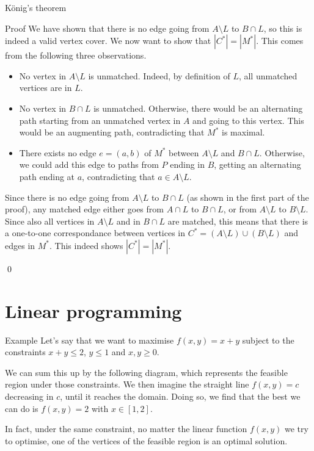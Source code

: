 \documentclass[a4paper]{article}
\begin{document}
\begin{parag}{König's theorem}
\begin{subparag}{Proof}
        We have shown that there is no edge going from $A \setminus L$ to $B \cap L$, so this is indeed a valid vertex cover. We now want to show that $\left|C^*\right| = \left|M^*\right|$. This comes from the following three observations.
        \begin{itemize}[left=0pt]
            \item No vertex in $A \setminus L$ is unmatched. Indeed, by definition of $L$, all unmatched vertices are in $L$.
            \item No vertex in $B \cap L$ is unmatched. Otherwise, there would be an alternating path starting from an unmatched vertex in $A$ and going to this vertex. This would be an augmenting path, contradicting that $M^*$ is maximal.
            \item There exists no edge $e = \left(a, b\right)$ of $M^*$ between $A \setminus L$ and $B \cap L$. Otherwise, we could add this edge to paths from $P$ ending in $B$, getting an alternating path ending at $a$, contradicting that $a \in A \setminus L$.
        \end{itemize}

        Since there is no edge going from $A \setminus L$ to $B \cap L$ (as shown in the first part of the proof), any matched edge either goes from $A \cap L$ to $B \cap L$, or from $A \setminus L$ to $B \setminus L$. Since also all vertices in $A \setminus L$ and in $B \cap L$ are matched, this means that there is a one-to-one correspondance between vertices in $C^* = \left(A \setminus L\right) \cup \left(B \setminus L\right)$ and edges in $M^*$. This indeed shows $\left|C^*\right| = \left|M^*\right|$.

        \qed
    \end{subparag}
\end{parag}


\section{Linear programming}

\begin{parag}{Example}
    Let's say that we want to maximise $f\left(x, y\right) = x + y$ subject to the constraints $x + y \leq 2$, $y \leq 1$ and $x, y \geq 0$.

    We can sum this up by the following diagram, which represents the feasible region under those constraints. We then imagine the straight line $f\left(x, y\right) = c$ decreasing in $c$, until it reaches the domain. Doing so, we find that the best we can do is $f\left(x, y\right) = 2$ with $x \in \left[1, 2\right]$.

    In fact, under the same constraint, no matter the linear function $f\left(x, y\right)$ we try to optimise, one of the vertices of the feasible region is an optimal solution.
\end{parag}
\end{document}
